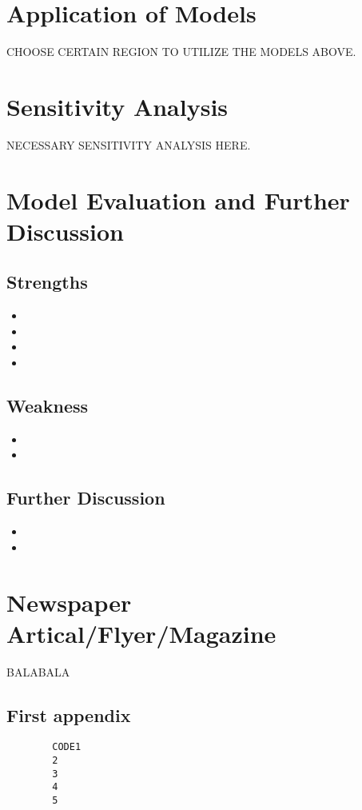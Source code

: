 \documentclass{mcmthesis}
\begin{document}
\section{Application of Models}
CHOOSE CERTAIN REGION TO UTILIZE THE MODELS ABOVE.

\section{Sensitivity Analysis}
NECESSARY SENSITIVITY ANALYSIS HERE.

\section{Model Evaluation and Further Discussion}
\subsection{Strengths}
\begin{itemize}
	\item
	\item
	\item
	\item
\end{itemize}
\subsection{Weakness}
\begin{itemize}
	\item
	\item
\end{itemize}
\subsection{Further Discussion}
\begin{itemize}
	\item
	\item
\end{itemize}

\section{Newspaper Artical/Flyer/Magazine}
BALABALA

\newpage
\newpage
\begin{thebibliography}{99}%
\end{thebibliography}

\newpage
\newpage

\newpage
\newpage
\begin{appendices}
	\section{First appendix}
	\begin{lstlisting}
		CODE1
		2
		3
		4
		5
	\end{lstlisting}
\end{appendices}
\end{document}
